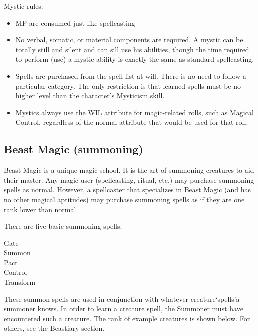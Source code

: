 \documentclass[twoside]{book}
\begin{document}
    {  
    Mystic rules:
    }
  
\begin{itemize}
      
  \item MP are consumed just like spellcasting
  \item No verbal, somatic, or material components are required. A mystic can be totally still and silent and can sill use his abilities, though the time required to perform (use) a mystic ability is exactly the same as standard spellcasting.
  \item Spells are purchased from the spell list at will. There is no need to follow a particular category. The only restriction is that learned spells must be no higher level than the character's Mysticism skill.
  \item Mystics always use the WIL attribute for magic-related rolls, such as Magical Control, regardless of the normal attribute that would be used for that roll.
\end{itemize}
  
    

\subsection{Beast Magic (summoning)}
    
    {  
    Beast Magic is a unique magic school. It is the art of summoning creatures to aid their master. Any magic user (spellcasting, ritual, etc.) may purchase summoning spells as normal. However, a spellcaster that specializes in Beast Magic (and has no other magical aptitudes) may purchase summoning spells as if they are one rank lower than normal.
    }
  
    {  
    There are five basic summoning spells:
    }
  
\begin{description}
    
  \item[Gate] 
  \item[Summon] 
  \item[Pact] 
  \item[Control] 
  \item[Transform] 
\end{description}
  
    {  
    These summon spells are used in conjunction with whatever creature`spells'a summoner knows. In order to learn a creature spell, the Summoner must have encountered such a creature. The rank of example creatures is shown below. For others, see the Beastiary section.
    }
  
\end{document}
